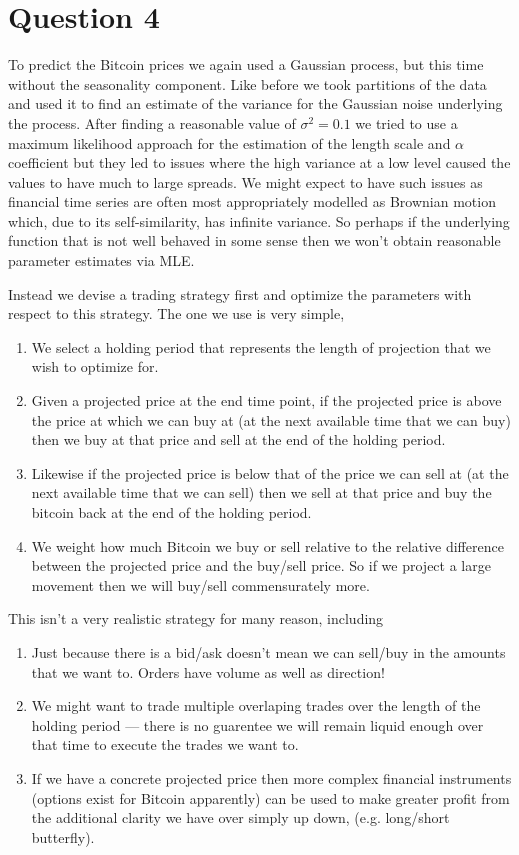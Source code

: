 \documentclass[a4paper]{article}
\begin{document}
\section*{Question 4}

To predict the Bitcoin prices we again used a Gaussian process, but this time without the seasonality component. Like before we took partitions of the data and used it to find an estimate of the variance for the Gaussian noise underlying the process. After finding a reasonable value of $\sigma^2 = 0.1$ we tried to use a maximum likelihood approach for the estimation of the length scale and $\alpha$ coefficient but they led to issues where the high variance at a low level caused the values to have much to large spreads. We might expect to have such issues as financial time series are often most appropriately modelled as Brownian motion which, due to its self-similarity, has infinite variance. So perhaps if the underlying function that is not well behaved in some sense then we won't obtain reasonable parameter estimates via MLE.

Instead we devise a trading strategy first and optimize the parameters with respect to this strategy. The one we use is very simple, 
\begin{enumerate}
\item We select a holding period that represents the length of projection that we wish to optimize for.
\item Given a projected price at the end time point, if the projected price is above the price at which we can buy at (at the next available time that we can buy) then we buy at that price and sell at the end of the holding period.
\item Likewise if the projected price is below that of the price we can sell at (at the next available time that we can sell) then we sell at that price and buy the bitcoin back at the end of the holding period. 
\item We weight how much Bitcoin we buy or sell relative to the relative difference between the projected price and the buy/sell price. So if we project a large movement then we will buy/sell commensurately more.
\end{enumerate}

This isn't a very realistic strategy for many reason, including
\begin{enumerate}
\item Just because there is a bid/ask doesn't mean we can sell/buy in the amounts that we want to. Orders have volume as well as direction!
\item We might want to trade multiple overlaping trades over the length of the holding period --- there is no guarentee we will remain liquid enough over that time to execute the trades we want to.
\item If we have a concrete projected price then more complex financial instruments (options exist for Bitcoin apparently) can be used to make greater profit from the additional clarity we have over simply up down, (e.g. long/short butterfly).  
\end{enumerate}
\end{document}
